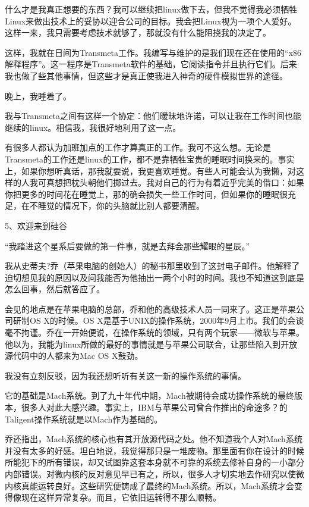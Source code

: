 什么才是我真正想要的东西？我可以继续把linux做下去，但我不觉得我必须牺牲Linux来做出技术上的妥协以迎合公司的目标。我会把Linux视为一项个人爱好。这样一来，我只需要考虑技术就够了，那就没有什么能阻挠我的决定了。

这样，我就在日间为Transmeta工作。我编写与维护的是我们现在还在使用的“x86解释程序”。这一程序是Transmeta软件的基础，它阅读指令并且执行它们。后来我也做了些其他事情，但这些才是真正使我进入神奇的硬件模拟世界的途径。

晚上，我睡着了。

我与Transmeta之间有这样一个协定：他们暧昧地许诺，可以让我在工作时间也能继续的linux。相信我，我很好地利用了这一点。

有很多人都认为加班加点的工作才算真正的工作。我可不这么想。无论是Transmeta的工作还是linux的工作，都不是靠牺牲宝贵的睡眠时间换来的。事实上，如果你想听真话，那我就要说，我更喜欢睡觉。有些人可能会认为我懒，对这样的人我可真想把枕头朝他们掷过去。我对自己的行为有着近乎完美的借口：如果你把更多的时间花在睡觉上，那的确会损失一些工作时间，但如果你的睡眠很充足，在不睡觉的情况下，你的头脑就比别人都要清醒。

 
5、欢迎来到硅谷

“我踏进这个星系后要做的第一件事，就是去拜会那些耀眼的星辰。”

我从史蒂夫?乔（苹果电脑的创始人）的秘书那里收到了这封电子邮件。他解释了迫切想见我的原因以及问我能否为他抽出一两个小时的时间。我也不知道这到底是怎么回事，然后就答应了。

会见的地点是在苹果电脑的总部，乔和他的高级技术人员一同来了。这正是苹果公司研制OS X的时候。OS X是基于UNIX的操作系统，2000年9月上市。我们的会谈毫不拘谨。乔在一开始便说，在操作系统的领域，只有两个玩家——微软与苹果。他以为，我能为linux所做的最好的事情就是与苹果公司联合，让那些陷入到开放源代码中的人都来为Mac OS X鼓劲。

我没有立刻反驳，因为我还想听听有关这一新的操作系统的事情。

它的基础是Mach系统。到了九十年代中期，Mach被期待会成功操作系统的最终版本，很多人对此大感兴趣。事实上，IBM与苹果公司曾合作推出的命途多？的Taligent操作系统就是以Mach作为基础的。

乔还指出，Mach系统的核心也有其开放源代码之处。他不知道我个人对Mach系统并没有太多的好感。坦白地说，我觉得那只是一堆废物。那里面有你在设计的时候所能犯下的所有错误，却又试图靠这套本身就不可靠的系统去修补自身的一小部分内部错误。对微内核的反对意见早已有之，所以，很多人才切实地去作研究以使微内核真能运转良好。这些研究便铸成了最终的Mach系统。所以，Mach系统才会变得像现在这样异常复杂。而且，它依旧运转得不那么顺畅。


